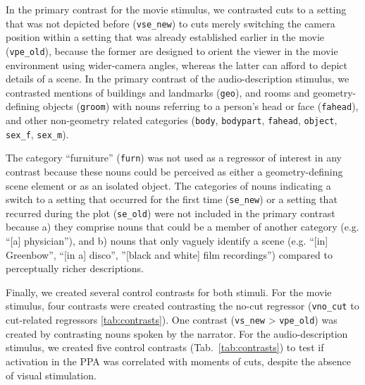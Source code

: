\documentclass[english]{article}
\begin{document}
In the primary contrast for the movie stimulus, we contrasted cuts to a setting
that was not depicted before (\texttt{vse\_new}) to cuts merely switching the
camera position within a setting that was already established earlier in the
movie (\texttt{vpe\_old}), because the former are designed to orient the viewer
in the movie environment using wider-camera angles, whereas the latter can
afford to depict details of a scene.
In the primary contrast of the audio-description stimulus, we contrasted
mentions of buildings and landmarks (\texttt{geo}), and rooms and
geometry-defining objects (\texttt{groom}) with nouns referring to a
person's head or face (\texttt{fahead}), and other non-geometry related
categories (\texttt{body}, \texttt{bodypart}, \texttt{fahead}, \texttt{object},
\texttt{sex\_f}, \texttt{sex\_m}).

The category ``furniture'' (\texttt{furn}) was not used as a regressor of
interest in any contrast because these nouns could be perceived as either a
geometry-defining scene element or as an isolated object.
The categories of nouns indicating a switch to a setting that occurred for the
first time (\texttt{se\_new}) or a setting that recurred during the plot
(\texttt{se\_old}) were not included in the primary contrast because
a) they comprise nouns that could be a member of another category (e.g. ``[a]
physician''), and
b) nouns that only vaguely identify a scene (e.g. ``[in] Greenbow'', ``[in a]
disco'', ''[black and white] film recordings'') compared to perceptually richer
descriptions.

Finally, we created several control contrasts for both stimuli.
For the movie stimulus, four contrasts were created contrasting the no-cut
regressor (\texttt{vno\_cut} to cut-related regressors \ref{tab:contrasts}).
One contrast (\texttt{vs\_new} > \texttt{vpe\_old}) was created by contrasting
nouns spoken by the narrator.
For the audio-description stimulus, we created five control contrasts
(Tab.~\ref{tab:contrasts}) to test if activation in the PPA was
correlated with moments of cuts, despite the absence of visual stimulation.
\end{document}
